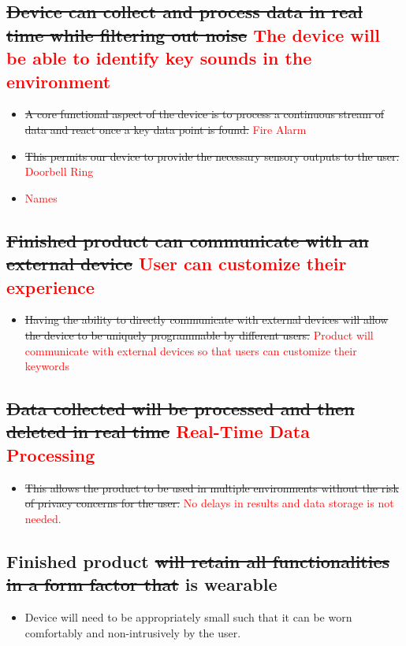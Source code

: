 \documentclass[12pt, titlepage]{article}
\begin{document}
 \subsection{\sout{Device can collect and process data in real time while filtering out noise} \textcolor{red}{The device will be able to identify key sounds in the environment}}  
 \begin{itemize}
    \item \sout{A core functional aspect of the device is to process a continuous stream of data and react once a key data point is found.} \textcolor{red}{Fire Alarm}
    \item \sout{This permits our device to provide the necessary sensory outputs to the user.} \textcolor{red}{Doorbell Ring}
    \item \textcolor{red}{Names}
  \end{itemize} 

 \subsection{\sout{Finished product can communicate with an external device} \textcolor{red}{User can customize their experience}}
 \begin{itemize}
    \item \sout{Having the ability to directly communicate with external devices will allow the device to be uniquely programmable by different users.} \textcolor{red}{Product will communicate with external devices so that users can customize their keywords}
 \end{itemize}

 \subsection{\sout{Data collected will be processed and then deleted in real time} \textcolor{red}{Real-Time Data Processing}}
 \begin{itemize}
    \item \sout{This allows the product to be used in multiple environments without the risk of privacy concerns for the user.} \textcolor{red}{No delays in results and data storage is not needed.}
\end{itemize}  

 \subsection{Finished product \sout{will retain all functionalities in a form factor that} is wearable}
 \begin{itemize}
    \item Device will need to be appropriately small such that it can be worn comfortably and non-intrusively by the user.
 \end{itemize}
\end{document}
